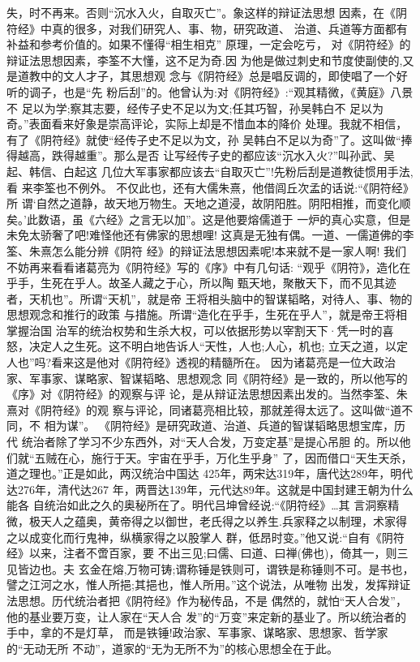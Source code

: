\documentclass[12pt,UTF8]{ctexbook}
\begin{document}
失，时不再来。否则“沉水入火，自取灭亡”。象这样的辩证法思想
因素，在《阴符经》中真的很多，对我们研究人、事、物，研究政道、
治道、兵道等方面都有补益和参考价值的。如果不懂得“相生相克”
原理，一定会吃亏，
对《阴符经》的辩证法思想因素，李筌不大懂，这不足为奇.因
为他是做过刺史和节度使副使的,又是道教中的文人才子，其思想观
念与《阴符经》总是唱反调的，即使唱了一个好听的调子，也是“先
粉后刮”的。他曾认为:对《阴符经》:“观其精微，《黄庭》八景不
足以为学;察其志要，经传子史不足以为文;任其巧智，孙吴韩白不
足以为奇。”表面看来好象是崇高评论，实际上却是不惜血本的降价
处理。我就不相信，有了《阴符经》就使“经传子史不足以为文，孙
吴韩白不足以为奇”了。这叫做“捧得越高，跌得越重”。那么是否
让写经传子史的都应该“沉水入火?”叫孙武、吴起、韩信、白起这
几位大军事家都应该去“自取灭亡”!先粉后刮是道教徒惯用手法,看
来李筌也不例外。
不仅此也，还有大儒朱熹，他借闾丘次孟的话说:“《阴符经》所
谓‘自然之道静，故天地万物生。天地之道浸，故阴阳胜。阴阳相推，而变化顺矣。’此数语，虽《六经》之言无以加”。这是他要熔儒道于
一炉的真心实意，但是未免太骄奢了吧!难怪他还有佛家的思想哩!
这真是无独有偶。一道、一儒道佛的李筌、朱熹怎么能分辨《阴符
经》的辩证法思想因素呢!本来就不是一家人啊!
我们不妨再来看看诸葛亮为《阴符经》写的《序》中有几句话:
“观乎《阴符》，造化在乎手，生死在乎人。故圣人藏之于心，所以陶
甄天地，聚散天下，而不见其迹者，天机也”。所谓“天机”，就是帝
王将相头脑中的智谋韬略，对待人、事、物的思想观念和推行的政策
与措施。所谓“造化在乎手，生死在乎人”，就是帝王将相掌握治国
治军的统治权势和生杀大权，可以依据形势以宰割天下·凭一时的喜
怒，决定人之生死。这不明白地告诉人“天性，人也;人心，机也;
立天之道，以定人也”吗?看来这是他对《阴符经》透视的精髓所在。
因为诸葛亮是一位大政治家、军事家、谋略家、智谋韬略、思想观念
同《阴符经》是一致的，所以他写的《序》对《阴符经》的观察与评
论，是从辩证法思想因素出发的。当然李筌、朱熹对《阴符经》的观
察与评论，同诸葛亮相比较，那就差得太远了。这叫做“道不同，不
相为谋”。
《阴符经》是研究政道、治道、兵道的智谋韬略思想宝库，历代
统治者除了学习不少东西外，对“天人合发，万变定基”是提心吊胆
的。所以他们就“五贼在心，施行于天。宇宙在乎手，万化生乎身”
了，因而借口“天生天杀，道之理也。”正是如此，两汉统治中国达
425年，两宋达319年，唐代达289年，明代达276年，清代达267
年，两晋达139年，元代达89年。这就是中国封建王朝为什么能各
自统治如此之久的奥秘所在了。明代吕坤曾经说:“《阴符经》…其
言洞察精微，极天人之蕴奥，黄帝得之以御世，老氏得之以养生.兵家释之以制理，术家得之以成变化而行鬼神，纵横家得之以股掌人
群，低昂时变。”他又说:“自有《阴符经》以来，注者不啻百家，要
不出三见;曰儒、曰道、曰禅(佛也)，倚其一，则三见皆边也。夫
玄金在熔,万物可铸;谓称锤是铁则可，谓铁是称锤则不可。是书也，
譬之江河之水，惟人所挹;其挹也，惟人所用。”这个说法，从唯物
出发，发挥辩证法思想。历代统治者把《阴符经》作为秘传品，不是
偶然的，就怕“天人合发”，他的基业要万变，让人家在“天人合
发”的“万变”来定新的基业了。所以统治者的手中，拿的不是灯草，
而是铁锤!政治家、军事家、谋略家、思想家、哲学家的“无动无所
不动”，道家的“无为无所不为”的核心思想全在于此。
\end{document}
